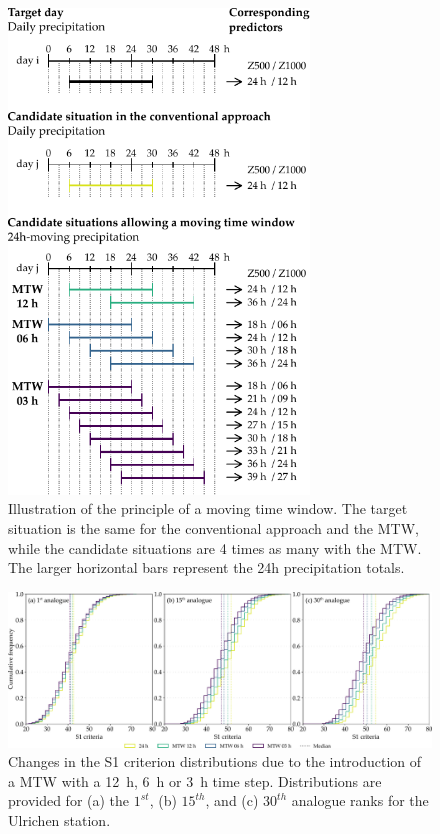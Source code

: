 \documentclass[hess, manuscript]{copernicus}
\begin{document}
	\begin{figure}[htb]
		\begin{center}
			\includegraphics[width=8cm]{fig02.pdf}
		\end{center}
		\caption{Illustration of the principle of a moving time window. The target situation is the same for the conventional approach and the MTW, while the candidate situations are 4 times as many with the MTW. The larger horizontal bars represent the 24h precipitation totals.}
		\label{fig:principle}
	\end{figure}
	
	\begin{figure}[htb]
		\begin{center}
			\includegraphics[width=17cm]{fig05.pdf}
		\end{center}
		\caption{Changes in the S1 criterion distributions due to the introduction of a MTW with a 12~h, 6~h or 3~h time step. Distributions are provided for (a) the $1^{st}$, (b) $15^{th}$, and (c) $30^{th}$ analogue ranks for the Ulrichen station.}
		\label{fig:changes_S1_analogs}
	\end{figure}
	
\end{document}

